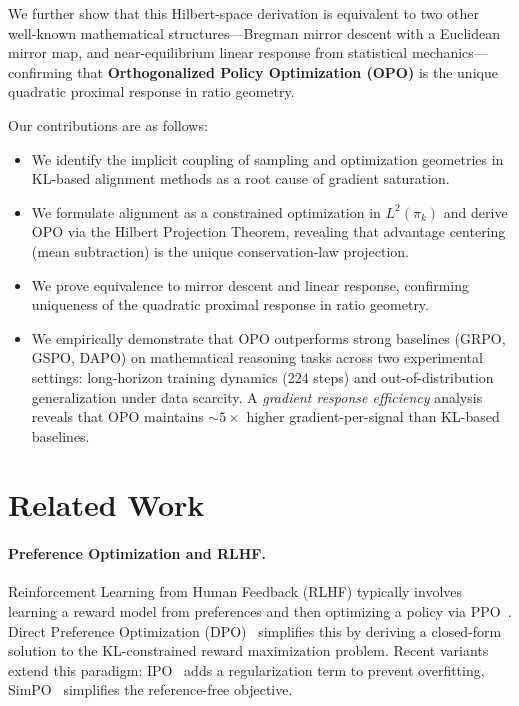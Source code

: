 \documentclass[11pt]{article}
\theoremstyle{definition}
\theoremstyle{remark}
\newcommand{\pik}{\pi_k}
\begin{document}
We further show that this Hilbert-space derivation is equivalent to two other well-known mathematical structures---Bregman mirror descent with a Euclidean mirror map, and near-equilibrium linear response from statistical mechanics---confirming that \textbf{Orthogonalized Policy Optimization (OPO)} is the unique quadratic proximal response in ratio geometry.

Our contributions are as follows:
\begin{itemize}
    \item We identify the implicit coupling of sampling and optimization geometries in KL-based alignment methods as a root cause of gradient saturation.
    \item We formulate alignment as a constrained optimization in $L^2(\pik)$ and derive OPO via the Hilbert Projection Theorem, revealing that advantage centering (mean subtraction) is the unique conservation-law projection.
    \item We prove equivalence to mirror descent and linear response, confirming uniqueness of the quadratic proximal response in ratio geometry.
    \item We empirically demonstrate that OPO outperforms strong baselines (GRPO, GSPO, DAPO) on mathematical reasoning tasks across two experimental settings: long-horizon training dynamics (224 steps) and out-of-distribution generalization under data scarcity. A \emph{gradient response efficiency} analysis reveals that OPO maintains ${\sim}5{\times}$ higher gradient-per-signal than KL-based baselines.
\end{itemize}

\section{Related Work}
\label{sec:related}

\paragraph{Preference Optimization and RLHF.}
Reinforcement Learning from Human Feedback (RLHF) typically involves learning a reward model from preferences and then optimizing a policy via PPO~\cite{Schulman2017PPO,Christiano2017RLHF,Ouyang2022InstructGPT}. Direct Preference Optimization (DPO)~\cite{Rafailov2023DPO} simplifies this by deriving a closed-form solution to the KL-constrained reward maximization problem. Recent variants extend this paradigm: IPO~\cite{Azar2024IPO} adds a regularization term to prevent overfitting, SimPO~\cite{Meng2024SimPO} simplifies the reference-free objective.
\end{document}
